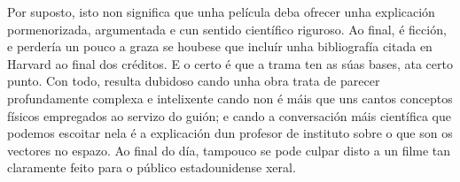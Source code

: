 \begin{refsection}
\begin{multicols}{2}
Por suposto, isto non significa que unha película deba ofrecer unha explicación
pormenorizada, argumentada e cun sentido científico riguroso. Ao final, é
ficción, e perdería un pouco a graza se houbese que incluír unha bibliografía
citada en Harvard ao final dos créditos. E o certo é que a trama ten as súas
bases, ata certo punto. Con todo, resulta dubidoso cando unha obra trata de
parecer profundamente complexa e intelixente cando non é máis que uns cantos
conceptos físicos empregados ao servizo do guión; e cando a conversación máis
científica que podemos escoitar nela é a explicación dun profesor de instituto
sobre o que son os vectores no espazo. Ao final do día, tampouco se pode culpar
disto a un filme tan claramente feito para o público estadounidense xeral.

\nocite{deutsch.m_1994}
\nocite{donnie_darko}
\nocite{gribbin.j_2020}
\nocite{nunez.r_2021}
\nocite{wisecrack_2019}

\printbibliography

\end{multicols}
\end{refsection}
